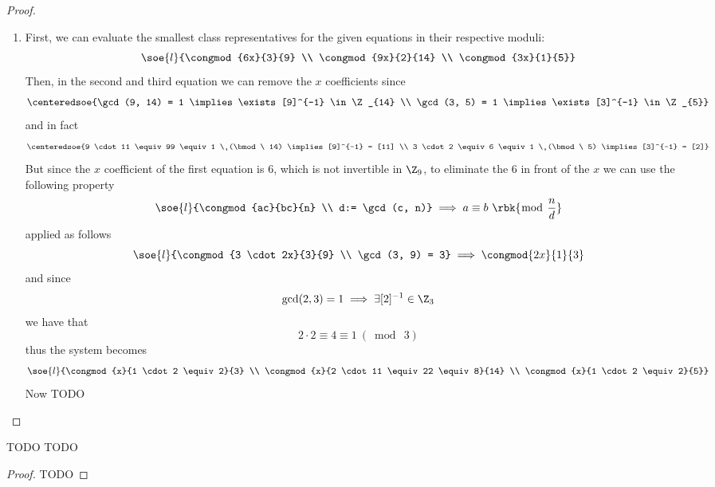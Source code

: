 \documentclass[a4paper, 12pt]{report}
\begin{document}
    \begin{proof}
        \begin{enumerate}
            \item First, we can evaluate the smallest class representatives for the given equations in their respective moduli: $$\soe{l}{\congmod{6x}{3}{9} \\ \congmod{9x}{2}{14} \\ \congmod{3x}{1}{5}}$$ Then, in the second and third equation we can remove the $x$ coefficients since $$\centeredsoe{\gcd(9, 14) = 1 \implies \exists [9]^{-1} \in \Z_{14} \\ \gcd(3, 5) = 1 \implies \exists [3]^{-1} \in \Z_{5}}$$ and in fact $$\centeredsoe{9 \cdot 11 \equiv 99 \equiv 1 \ (\bmod \ 14) \implies [9]^{-1} = [11] \\ 3 \cdot 2 \equiv 6 \equiv 1 \ (\bmod \ 5) \implies [3]^{-1} = [2]}$$ But since the $x$ coefficient of the first equation is 6, which is not invertible in $\Z_9$, to eliminate the 6 in front of the $x$ we can use the following property $$\soe{l}{\congmod{ac}{bc}{n} \\ d:= \gcd(c, n)} \implies a \equiv b \ \rbk{\bmod \ \dfrac{n}{d}}$$ applied as follows $$\soe{l}{\congmod{3 \cdot 2x}{3}{9} \\ \gcd(3, 9) = 3} \implies \congmod{2x}{1}{3}$$ and since $$\gcd(2, 3) = 1 \implies \exists [2]^{-1} \in \Z_{3}$$ we have that $$2 \cdot 2 \equiv 4 \equiv 1 \ (\bmod \ 3)$$ thus the system becomes $$\soe{l}{\congmod{x}{1 \cdot2 \equiv 2}{3} \\ \congmod{x}{2 \cdot 11 \equiv 22 \equiv 8}{14} \\ \congmod{x}{1 \cdot 2 \equiv 2}{5}}$$ Now TODO
        \end{enumerate}
    \end{proof}

    \begin{framedprob}{TODO}
        TODO
    \end{framedprob}

    \begin{proof}
        TODO
    \end{proof}
\end{document}
